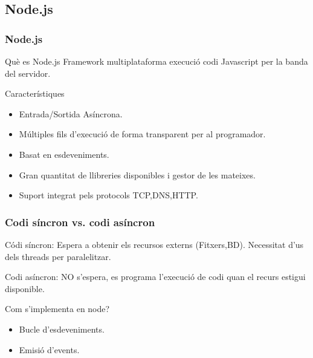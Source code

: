 \documentclass[notitlepage]{beamer}
\begin{document}
\subsection{Node.js}
\begin{frame}
\frametitle{Node.js}
\begin{block}{Què es Node.js}
Framework multiplataforma execució codi Javascript per la banda del servidor.
\end{block}

\begin{block}{Característiques}
\begin{itemize}
    \item{Entrada/Sortida Asíncrona.}
    \item{Múltiples fils d'execució de forma transparent per al programador.}
    \item{Basat en esdeveniments.}
    \item{Gran quantitat de llibreries disponibles i gestor de les mateixes.}
    \item{Suport integrat pels protocols TCP,DNS,HTTP.}
\end{itemize}
\end{block}

\end{frame}

\begin{frame}
\frametitle{Codi síncron vs. codi asíncron}
\begin{block}{Códi síncron:}
Espera a obtenir els recursos externs (Fitxers,BD). Necessitat d'us dels threads per paralelitzar.
\end{block}

\begin{block}{Codi asíncron:}
NO s'espera, es programa l'execució de codi quan el recurs estigui disponible.
\end{block}

\begin{block}{Com s'implementa en node?}
\begin{itemize}
    \item{Bucle d'esdeveniments.}
    \item{Emisió d'events.}
\end{itemize}
\end{block}

\end{frame}
\end{document}

